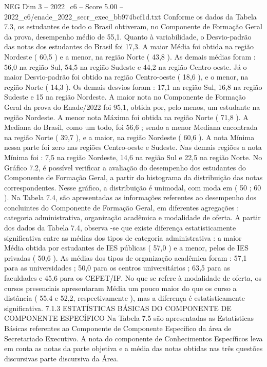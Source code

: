 \begin{textsample}{NEG Dim 3 – 2022\_c6 – Score 5.00 – 2022\_c6/enade\_2022\_secr\_exec\_bb974bcf1d.txt}
Conforme os dados da Tabela 7.3, os estudantes de todo o Brasil obtiveram, no Componente de Formação Geral da prova, desempenho médio de 55,1.
Quanto à variabilidade, o Desvio-padrão das notas dos estudantes do Brasil foi 17,3.
A maior Média foi obtida na região Nordeste ( 60,5 ) e a menor, na região Norte ( 43,8 ).
As demais médias foram : 56,0 na região Sul, 54,5 na região Sudeste e 44,2 na região Centro-oeste.
Já o maior Desvio-padrão foi obtido na região Centro-oeste ( 18,6 ), e o menor, na região Norte ( 14,3 ).
Os demais desvios foram : 17,1 na região Sul, 16,8 na região Sudeste e 15 na região Nordeste.
A maior nota no Componente de Formação Geral da prova do Enade/2022 foi 95,1, obtida por, pelo menos, um estudante na região Nordeste.
A menor nota Máxima foi obtida na região Norte ( 71,8 ).
A Mediana do Brasil, como um todo, foi 56,6 ; sendo a menor Mediana encontrada na região Norte ( 39,7 ), e a maior, na região Nordeste ( 60,6 ).
A nota Mínima nessa parte foi zero nas regiões Centro-oeste e Sudeste.
Nas demais regiões a nota Mínima foi : 7,5 na região Nordeste, 14,6 na região Sul e 22,5 na região Norte.
No Gráfico 7.2, é possível verificar a avaliação do desempenho dos estudantes do Componente de Formação Geral, a partir do histograma da distribuição das notas correspondentes.
Nesse gráfico, a distribuição é unimodal, com moda em ( 50 ; 60 ).
Na Tabela 7.4, são apresentadas as informações referentes ao desempenho dos concluintes do Componente de Formação Geral, em diferentes agregações : categoria administrativa, organização acadêmica e modalidade de oferta.
A partir dos dados da Tabela 7.4, observa -se que existe diferença estatisticamente significativa entre as médias dos tipos de categoria administrativa : a maior Média obtida por estudantes de IES públicas ( 57,0 ) e a menor, pelos de IES privadas ( 50,6 ).
As médias dos tipos de organização acadêmica foram : 57,1 para as universidades ; 50,0 para os centros universitários ; 63,5 para as faculdades e 45,6 para os CEFET/IF.
No que se refere à modalidade de oferta, os cursos presenciais apresentaram Média um pouco maior do que os curso a distância ( 55,4 e 52,2, respectivamente ), mas a diferença é estatisticamente significativa. 7.1.3 ESTATÍSTICAS BÁSICAS DO COMPONENTE DE COMPONENTE ESPECÍFICO Na Tabela 7.5 são apresentadas as Estatísticas Básicas referentes ao Componente de Componente Específico da área de Secretariado Executivo.
A nota do componente de Conhecimentos Específicos leva em conta as notas da parte objetiva e a média das notas obtidas nas três questões discursivas parte discursiva da Área.

\end{textsample}
